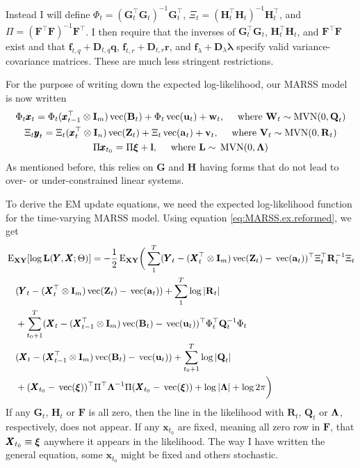 \documentclass[]{article}
\def\llambda{\pmb{\lambda}}
\def\xixi{\mbox{\boldmath $\xi$}}
\def\LAM{\mbox{\boldmath $\Lambda$}}
\def\UPS{\mbox{\boldmath $\Upsilon$}}
\def\XI{\mbox{\boldmath $\Xi$}}
\def\BB{\mbox{$\mathbf B$}}	\def\bb{\mbox{$\mathbf b$}} \def\Bb{\mbox{$\mathbf J$}} \def\Ba{\mbox{$\mathbf L$}} \def\Bm{\UPS}
\def\DD{\mbox{$\mathbf D$}}	\def\dd{\mbox{$\mathbf d$}}
\def\EXy{\,\textup{\textrm{E}}_{\text{{\bf XY}}}}
\def\FF{\mbox{$\mathbf F$}} \def\ff{\mbox{$\mathbf f$}}
\def\GG{\mbox{$\mathbf G$}}	\def\gg{\mbox{$\mathbf g$}}
\def\HH{\mbox{$\mathbf H$}}	\def\hh{\mbox{$\mathbf h$}}
\def\II{\mbox{$\mathbf I$}} \def\ii{\mbox{$\mathbf i$}}
\def\LL{\mbox{$\mathbf L$}}	\def\ll{\mbox{$\mathbf l$}}
\def\MVN{\,\textup{\textrm{MVN}}}
\def\QQ{\mbox{$\mathbf Q$}}	 \def\qq{\mbox{$\mathbf q$}} \def\Qb{\mbox{$\mathbf G$}}  \def\Qm{\mathbb{Q}}
\def\RR{\mbox{$\mathbf R$}}	 \def\rr{\mbox{$\mathbf r$}} \def\Rb{\mbox{$\mathbf H$}}	\def\Rm{\mathbb{R}}
\def\VV{\mbox{$\mathbf V$}}	\def\vv{\mbox{$\mathbf v$}}
\def\WW{\mbox{$\mathbf W$}}	\def\ww{\mbox{$\mathbf w$}}
\def\XX{\mbox{$\pmb{X}$}}	\def\xx{\mbox{$\pmb{x}$}}
\def\YY{\mbox{$\pmb{Y}$}}	\def\yy{\mbox{$\pmb{y}$}}
\def\ZZ{\mbox{$\mathbf Z$}}	\def\zz{\mbox{$\mathbf z$}}	\def\Zb{\mbox{$\mathbf M$}} \def\Za{\mbox{$\mathbf N$}} \def\Zm{\XI}
\def\vec{\,\textup{\textrm{vec}}}
\begin{document}
Instead I will define  $\Phi_t=(\GG_t^\top\GG_t)^{-1}\GG_t^\top$, $\Xi_t=(\HH_t^\top\HH_t)^{-1}\HH_t^\top$, and $\Pi = (\FF^\top\FF)^{-1}\FF^\top$. I then require that the inverses of $\GG_t^\top\GG_t$, $\HH_t^\top\HH_t$, and $\FF^\top\FF$ exist and that  $\ff_{t,q}+\DD_{t,q}\qq$, $\ff_{t,r}+\DD_{t,r}\rr$, and $\ff_\lambda+\DD_\lambda\llambda$ specify valid variance-covariance matrices. These are much less stringent restrictions.

For the purpose of writing down the expected log-likelihood, our MARSS model is now written
\begin{equation}\label{eq:MARSS.ex.reformed}
\begin{gathered}
\Phi_t\xx_t = \Phi_t( \xx_{t-1}^\top \otimes \II_m)\vec(\BB_t) + \Phi_t\vec(\uu_t) + \ww_t, \quad
\text{ where } \WW_t \sim \mathrm{MVN}(0,\QQ_t)\\
\Xi_t\yy_t = \Xi_t( \xx_t^\top \otimes \II_n)\vec(\ZZ_t) + \Xi_t\vec(\aa_t) + \vv_t,\quad \text{ where } \VV_t \sim \mathrm{MVN}(0,\RR_t)\\
\Pi\xx_{t_0}=\Pi\xixi+\ll, \quad \text{ where } \LL \sim \MVN(0,\LAM)
\end{gathered}
\end{equation}
As mentioned before, this relies on $\GG$ and $\HH$ having forms that do not lead to over- or under-constrained linear systems.

To derive the EM update equations, we need the expected log-likelihood function for the time-varying MARSS model.  Using equation \ref{eq:MARSS.ex.reformed}, we get
\begin{equation}\label{eq:logL.vec.general}
\begin{split}
&\EXy[\log\LL(\YY,\XX ; \Theta)] = -\frac{1}{2}\EXy\bigg(
 \sum_1^T(\YY_t - ( \XX_t^\top \otimes \II_m)\vec(\ZZ_t) - \vec(\aa_t) )^\top\Xi_t^\top \RR_t^{-1}\Xi_t\\
&\quad (\YY_t-(\XX_t^\top \otimes \II_m)\vec(\ZZ_t) - \vec(\aa_t))+\sum_1^T \log |\RR_t|\\
&\quad +\sum_{t_0+1}^T(\XX_t-(\XX_{t-1}^\top \otimes \II_m)\vec(\BB_t) - \vec(\uu_t) )^\top \Phi_t^\top\QQ_t^{-1}\Phi_t \\
&\quad ( \XX_t-(\XX_{t-1}^\top \otimes \II_m)\vec(\BB_t) - \vec(\uu_t) )+\sum_{t_0+1}^T\log |\QQ_t|\\
&\quad +(\XX_{t_0}-\vec(\xixi))^\top \Pi^\top\LAM^{-1}\Pi (\XX_{t_0}-\vec(\xixi)) + \log |\LAM| + \log 2\pi \bigg)
\end{split}
\end{equation}
If any $\GG_t$, $\HH_t$ or $\FF$ is all zero, then the line in the likelihood with $\RR_t$, $\QQ_t$ or $\LAM$, respectively, does not appear.  If any $\xx_{t_0}$ are fixed, meaning all zero row in $\FF$, that $\XX_{t_0}\equiv\xixi$ anywhere it appears in the likelihood.  The way I have written the general equation, some $\xx_{t_0}$ might be fixed and others stochastic.
\end{document}
